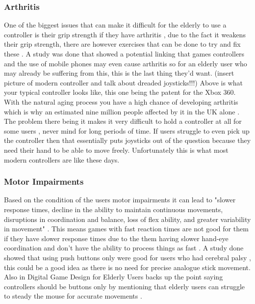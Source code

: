 \documentclass[journal]{IEEEtran}
\begin{document}
\subsubsection{Arthritis}
One of the biggest issues that can make it difficult for the elderly to use a controller is their grip strength if they have arthritis \cite{noauthor_managing_nodate}, due to the fact it weakens their grip strength, there are however exercises that can be done to try and fix these \cite{noauthor_managing_nodate}. A study was done that showed a potential linking that games controllers and the use of mobile phones may even cause arthritis \cite{noauthor_games_2011} so for an elderly user who may already be suffering from this, this is the last thing they'd want. 
\newline
(insert picture of modern controller and talk about dreaded joysticks!!!) \cite{ikeda_game_2012}
\newline
Above is what your typical controller looks like, this one being the patent for the Xbox 360. With the natural aging process you have a high chance of developing arthritis which is why an estimated nine million people affected by it in the UK alone \cite{noauthor_arthritis_2017}. The problem there being it makes it very difficult to hold a controller at all for some users \cite{gamecentral_perils_2016}, never mind for long periods of time. If users struggle to even pick up the controller then that essentially puts joysticks out of the question because they need their hand to be able to move freely. Unfortunately this is what most modern controllers are like these days.

\subsubsection{Motor Impairments}
Based on the condition of the users motor impairments it can lead to "slower response times, decline in the ability to maintain continuous movements, disruptions in coordination and balance, loss of flex ability, and greater variability in movement" \cite{ijsselsteijn_digital_2007}. This means games with fast reaction times are not good for them if they have slower response times due to the them having slower hand-eye coordination and don't have the ability to process things as fast \cite{ijsselsteijn_digital_2007}. A study done showed that using push buttons only were good for users who had cerebral palsy \cite{soto_online_2015}, this could be a good idea as there is no need for precise analogue stick movement. Also in Digital Game Design for Elderly Users backs up the point saying controllers should be buttons only by mentioning that elderly users can struggle to steady the mouse for accurate movements \cite{ijsselsteijn_digital_2007}.
\end{document}
